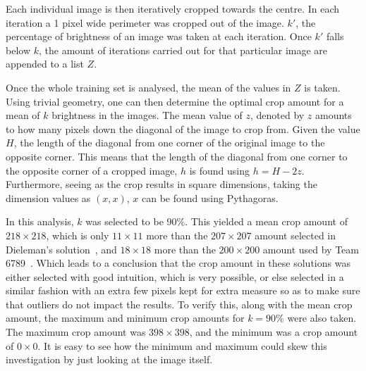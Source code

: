 \documentclass[12pt,a4paper,oneside,oldfontcommands]{memoir}
\begin{document}
Each individual image is then iteratively cropped towards the centre. In each iteration a 1 pixel wide perimeter was cropped out of the image. \(k'\), the percentage of brightness of an image was taken at each iteration. Once \(k'\) falls below \(k\), the amount of iterations carried out for that particular image are appended to a list \(Z\).

Once the whole training set is analysed, the mean of the values in \(Z\) is taken. Using trivial geometry, one can then determine the optimal crop amount for a mean of \(k\) brightness in the images. The mean value of \(z\), denoted by \(z\) amounts to how many pixels down the diagonal of the image to crop from. Given the value \(H\), the length of the diagonal from one corner of the original image to the opposite corner. This means that the length of the diagonal from one corner to the opposite corner of a cropped image, \(h\) is found using \(h = H - 2z\). Furthermore, seeing as the crop results in square dimensions, taking the dimension values as \((x, x)\), \(x\) can be found using Pythagoras. 

In this analysis, \(k\) was selected to be 90\%. This yielded a mean crop amount of \(218\times218\), which is only \(11\times11\) more than the \(207\times207\) amount selected in Dieleman's solution~\cite{Sanders-GZ}, and \(18\times18\) more than the \(200\times200\) amount used by Team 6789~\cite{Nguyen}. Which leads to a conclusion that the crop amount in these solutions was either selected with good intuition, which is very possible, or else selected in a similar fashion with an extra few pixels kept for extra measure so as to make sure that outliers do not impact the results. To verify this, along with the mean crop amount, the maximum and minimum crop amounts for \(k=90\%\) were also taken. The maximum crop amount was \(398\times398\), and the minimum was a crop amount of \(0\times0\). It is easy to see how the minimum and maximum could skew this investigation by just looking at the image itself.  
\end{document}

